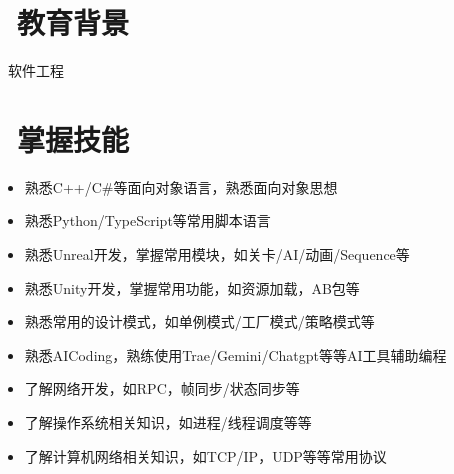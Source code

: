 \documentclass{resume}
\begin{document}


 
\section{\faGraduationCap\  教育背景}
\textit{}\ 软件工程

\section{\faCogs\ 掌握技能}
\begin{itemize}[parsep=0.5ex]
  \item 熟悉C++/C\#等面向对象语言，熟悉面向对象思想
  \item 熟悉Python/TypeScript等常用脚本语言
  \item 熟悉Unreal开发，掌握常用模块，如关卡/AI/动画/Sequence等
  \item 熟悉Unity开发，掌握常用功能，如资源加载，AB包等
  \item 熟悉常用的设计模式，如单例模式/工厂模式/策略模式等
  \item 熟悉AICoding，熟练使用Trae/Gemini/Chatgpt等等AI工具辅助编程
  \item 了解网络开发，如RPC，帧同步/状态同步等
  \item 了解操作系统相关知识，如进程/线程调度等等
  \item 了解计算机网络相关知识，如TCP/IP，UDP等等常用协议
\end{itemize}
\end{document}
